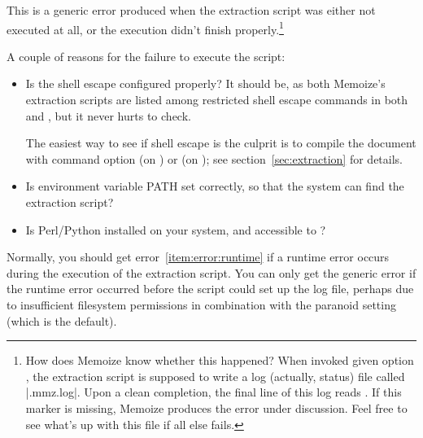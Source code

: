 \documentclass[a4paper,11pt]{article}
\begin{document}
\begin{enumerate}
  This is a generic error produced when the extraction script was either not
  executed at all, or the execution didn't finish properly.\footnote{How does
    Memoize know whether this happened?  When invoked given option
    , the extraction script is supposed
    to write a log (actually, status) file called
    \mbox{}|.mmz.log|.  Upon a clean completion, the final line
    of this log reads .  If this marker is missing, Memoize
    produces the error under discussion.  Feel free to see what's up with this
    file if all else fails.}

  A couple of reasons for the failure to execute the script:
  \begin{itemize}
  \item Is the shell escape configured properly?  It should be, as both
    Memoize's extraction scripts are listed among restricted shell escape
    commands in both \TeXLive and \MiKTeX, but it never hurts
    to check.

    The easiest way to see if shell escape is the culprit is to compile the
    document with command option  (on \TeXLive) or
     (on \MiKTeX); see section~\ref{sec:extraction}
    for details.
  \item Is environment variable PATH set correctly, so that the system can find
    the extraction script?
  \item Is Perl\slash Python installed on your system, and accessible to
    ?
  \end{itemize}

  Normally, you should get error~\ref{item:error:runtime} if a runtime error
  occurs during the execution of the extraction script.  You can only get the
  generic error if the runtime error occurred before the script could set up
  the log file, perhaps due to insufficient filesystem permissions in
  combination with the paranoid  setting (which is the
  default).


\end{enumerate}
\end{document}

